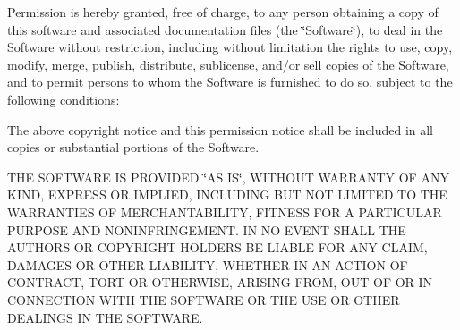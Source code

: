 Permission is hereby granted, free of charge, to any person obtaining a copy of this software and associated documentation files (the \char`\"{}\-Software\char`\"{}), to deal in the Software without restriction, including without limitation the rights to use, copy, modify, merge, publish, distribute, sublicense, and/or sell copies of the Software, and to permit persons to whom the Software is furnished to do so, subject to the following conditions\-:

The above copyright notice and this permission notice shall be included in all copies or substantial portions of the Software.

T\-H\-E S\-O\-F\-T\-W\-A\-R\-E I\-S P\-R\-O\-V\-I\-D\-E\-D \char`\"{}\-A\-S I\-S\char`\"{}, W\-I\-T\-H\-O\-U\-T W\-A\-R\-R\-A\-N\-T\-Y O\-F A\-N\-Y K\-I\-N\-D, E\-X\-P\-R\-E\-S\-S O\-R I\-M\-P\-L\-I\-E\-D, I\-N\-C\-L\-U\-D\-I\-N\-G B\-U\-T N\-O\-T L\-I\-M\-I\-T\-E\-D T\-O T\-H\-E W\-A\-R\-R\-A\-N\-T\-I\-E\-S O\-F M\-E\-R\-C\-H\-A\-N\-T\-A\-B\-I\-L\-I\-T\-Y, F\-I\-T\-N\-E\-S\-S F\-O\-R A P\-A\-R\-T\-I\-C\-U\-L\-A\-R P\-U\-R\-P\-O\-S\-E A\-N\-D N\-O\-N\-I\-N\-F\-R\-I\-N\-G\-E\-M\-E\-N\-T. I\-N N\-O E\-V\-E\-N\-T S\-H\-A\-L\-L T\-H\-E A\-U\-T\-H\-O\-R\-S O\-R C\-O\-P\-Y\-R\-I\-G\-H\-T H\-O\-L\-D\-E\-R\-S B\-E L\-I\-A\-B\-L\-E F\-O\-R A\-N\-Y C\-L\-A\-I\-M, D\-A\-M\-A\-G\-E\-S O\-R O\-T\-H\-E\-R L\-I\-A\-B\-I\-L\-I\-T\-Y, W\-H\-E\-T\-H\-E\-R I\-N A\-N A\-C\-T\-I\-O\-N O\-F C\-O\-N\-T\-R\-A\-C\-T, T\-O\-R\-T O\-R O\-T\-H\-E\-R\-W\-I\-S\-E, A\-R\-I\-S\-I\-N\-G F\-R\-O\-M, O\-U\-T O\-F O\-R I\-N C\-O\-N\-N\-E\-C\-T\-I\-O\-N W\-I\-T\-H T\-H\-E S\-O\-F\-T\-W\-A\-R\-E O\-R T\-H\-E U\-S\-E O\-R O\-T\-H\-E\-R D\-E\-A\-L\-I\-N\-G\-S I\-N T\-H\-E S\-O\-F\-T\-W\-A\-R\-E. 